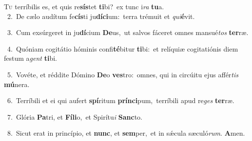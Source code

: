 \lettrine{\initial\textcolor{\initialcolor}{T}}{u} terríbilis es, et quis re\-\textbf{sís}\-tet \textbf{ti}\-bi?~\star ex tunc i\textit{ra} \textbf{tu}\-a.\\
{\numbfont\textcolor{\numbcolor}{~2.}}~De cælo audítum fe\-\textbf{cís}\-ti ju\-\textbf{dí}\-\textbf{ci}um:~\star terra trémuit et \textit{qui}\-\textbf{é}vit.\par
{\numbfont\textcolor{\numbcolor}{~3.}}~Cum exsúrgeret in ju\-\textbf{dí}\-cium \textbf{De}\-us,~\star ut salvos fáceret omnes mansué\textit{tos} \textbf{ter}\-ræ.\par
{\numbfont\textcolor{\numbcolor}{~4.}}~Quóniam cogitátio hóminis confi\-\textbf{té}\-bitur \textbf{ti}\-bi:~\star et relíquiæ cogitatiónis diem festum a\textit{gent} \textbf{ti}\-bi.\par
{\numbfont\textcolor{\numbcolor}{~5.}}~Vovéte, et réddite Dómino \textbf{De}\-o \textbf{ves}\-tro:~\star omnes, qui in circúitu ejus affér\textit{tis} \textbf{mú}\-nera.\par
{\numbfont\textcolor{\numbcolor}{~6.}}~Terríbili et ei qui aufert \textbf{spí}\-ritum \textbf{prín}\-\textbf{ci}pum,~\star terríbili apud re\textit{ges} \textbf{ter}\-ræ.\par
{\numbfont\textcolor{\numbcolor}{~7.}}~Glória \textbf{Pa}\-tri, et \textbf{Fí}\-\textbf{li}o,~\star et Spirítu\textit{i} \textbf{Sanc}\-to.\par
{\numbfont\textcolor{\numbcolor}{~8.}}~Sicut erat in princípio, et \textbf{nunc}\-, et \textbf{sem}\-per,~\star et in sǽcula sæculó\-\textit{rum}\-. \textbf{A}\-men.\par
